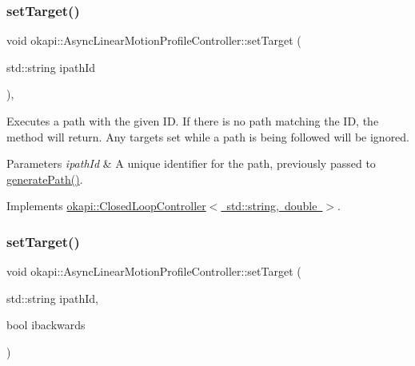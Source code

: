 \subsubsection{\texorpdfstring{setTarget()}{setTarget()}\hspace{0.1cm}{\footnotesize\ttfamily [1/2]}}
{\footnotesize\ttfamily void okapi\+::\+Async\+Linear\+Motion\+Profile\+Controller\+::set\+Target (\begin{DoxyParamCaption}\item[{std\+::string}]{ipath\+Id }\end{DoxyParamCaption})\hspace{0.3cm}{\ttfamily [override]}, {\ttfamily [virtual]}}

Executes a path with the given ID. If there is no path matching the ID, the method will return. Any targets set while a path is being followed will be ignored.


\begin{DoxyParams}{Parameters}
{\em ipath\+Id} & A unique identifier for the path, previously passed to \mbox{\hyperlink{classokapi_1_1AsyncLinearMotionProfileController_aef2acba51417d929695ca38e309b0f6c}{generate\+Path()}}. \\
\hline
\end{DoxyParams}


Implements \mbox{\hyperlink{classokapi_1_1ClosedLoopController_ac14482d0768b3f157d52e0214a4c36d7}{okapi\+::\+Closed\+Loop\+Controller$<$ std\+::string, double $>$}}.

\mbox{\label{classokapi_1_1AsyncLinearMotionProfileController_a7b1aa345da6264a6bd76ab106ade2a56}} 
\subsubsection{\texorpdfstring{setTarget()}{setTarget()}\hspace{0.1cm}{\footnotesize\ttfamily [2/2]}}
{\footnotesize\ttfamily void okapi\+::\+Async\+Linear\+Motion\+Profile\+Controller\+::set\+Target (\begin{DoxyParamCaption}\item[{std\+::string}]{ipath\+Id,  }\item[{bool}]{ibackwards }\end{DoxyParamCaption})}

